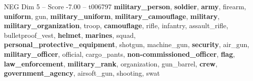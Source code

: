 \begin{textsample}{NEG Dim 5 – Score -7.00 – t006797}  \label{ex:f5_neg_014}
\textbf{military\_person}, \textbf{soldier}, \textbf{army}, firearm, \textbf{uniform}, gun, \textbf{military\_uniform}, \textbf{military\_camouflage}, \textbf{military}, \textbf{military\_organization}, troop, \textbf{camouflage}, rifle, infantry, assault\_rifle, bulletproof\_vest, \textbf{helmet}, \textbf{marines}, squad, \textbf{personal\_protective\_equipment}, shotgun, machine\_gun, \textbf{security}, air\_gun, \textbf{military\_officer}, official, cargo\_pants, \textbf{non-commissioned\_officer}, \textbf{flag}, \textbf{law\_enforcement}, \textbf{military\_rank}, organization, gun\_barrel, \textbf{crew}, \textbf{government\_agency}, airsoft\_gun, shooting, swat

\end{textsample}
